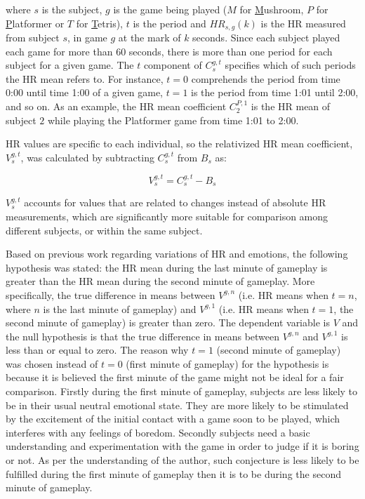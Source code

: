 where $s$ is the subject, $g$ is the game being played ($M$ for \underline{M}ushroom, $P$ for \underline{P}latformer or $T$ for \underline{T}etris), $t$ is the period and $HR_{s,g}(k)$ is the HR measured from subject $s$, in game $g$ at the mark of $k$ seconds. Since each subject played each game for more than 60 seconds, there is more than one period for each subject for a given game. The $t$ component of $C_s^{g,t}$ specifies which of such periods the HR mean refers to. For instance, $t=0$ comprehends the period from time 0:00 until time 1:00 of a given game, $t=1$ is the period from time 1:01 until 2:00, and so on. As an example, the HR mean coefficient $C_2^{P,1}$ is the HR mean of subject $2$ while playing the Platformer game from time 1:01 to 2:00.

HR values are specific to each individual, so the relativized HR mean coefficient, $V_s^{g,t}$, was calculated by subtracting $C_s^{g,t}$ from $B_s$ as:

\begin{equation} \label{eq:variation-normalized}
V_s^{g,t} = C_s^{g,t} - B_s
\end{equation}

$V_s^{g,t}$ accounts for values that are related to changes instead of absolute HR measurements, which are significantly more suitable for comparison among different subjects, or within the same subject.

Based on previous work regarding variations of HR and emotions, the following hypothesis was stated: the HR mean during the last minute of gameplay is greater than the HR mean during the second minute of gameplay. More specifically, the true difference in means between $V^{g,n}$ (i.e. HR means when $t=n$, where $n$ is the last minute of gameplay) and $V^{g,1}$ (i.e. HR means when $t=1$, the second minute of gameplay) is greater than zero. The dependent variable is $V$ and the null hypothesis is that the true difference in means between $V^{g,n}$ and $V^{g,1}$ is less than or equal to zero. The reason why $t=1$ (second minute of gameplay) was chosen instead of $t=0$ (first minute of gameplay) for the hypothesis is because it is believed the first minute of the game might not be ideal for a fair comparison. Firstly during the first minute of gameplay, subjects are less likely to be in their usual neutral emotional state. They are more likely to be stimulated by the excitement of the initial contact with a game soon to be played, which interferes with any feelings of boredom. Secondly subjects need a basic understanding and experimentation with the game in order to judge if it is boring or not. As per the understanding of the author, such conjecture is less likely to be fulfilled during the first minute of gameplay then it is to be during the second minute of gameplay.

